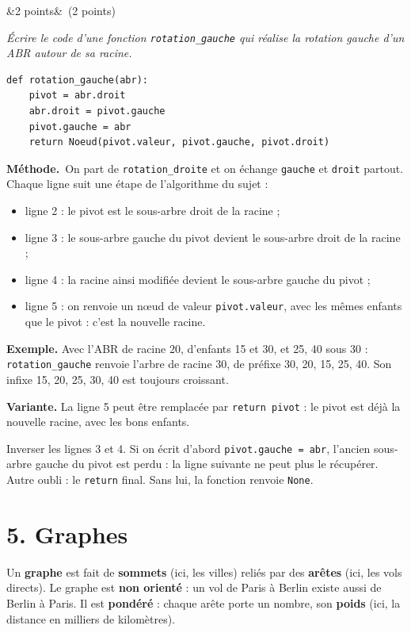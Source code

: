 \documentclass[11pt, a4paper]{exam}
\newcommand{\code}[1]{\texttt{#1}}
\newcommand{\Q}[3]{\par\needspace{5\baselineskip}\bigskip\noindent{\large\bfseries Question #1}\ifx&#2&\else\ \textnormal{(#2)}\fi\par\nopagebreak\smallskip\noindent\textit{#3}\par\nopagebreak\smallskip}
\newcommand{\methode}{\par\noindent\textbf{Méthode.}\ }
\begin{document}
\Q{6 (c)}{2 points}{Écrire le code d'une fonction \code{rotation\_gauche} qui réalise la rotation gauche d'un ABR autour de sa racine.}
\begin{reponse}
\begin{lstlisting}
def rotation_gauche(abr):
    pivot = abr.droit
    abr.droit = pivot.gauche
    pivot.gauche = abr
    return Noeud(pivot.valeur, pivot.gauche, pivot.droit)
\end{lstlisting}
\end{reponse}
\methode On part de \code{rotation\_droite} et on échange \code{gauche} et \code{droit} partout. Chaque ligne suit une étape de l'algorithme du sujet :
\begin{itemize}
\item ligne 2 : le pivot est le sous-arbre droit de la racine ;
\item ligne 3 : le sous-arbre gauche du pivot devient le sous-arbre droit de la racine ;
\item ligne 4 : la racine ainsi modifiée devient le sous-arbre gauche du pivot ;
\item ligne 5 : on renvoie un nœud de valeur \code{pivot.valeur}, avec les mêmes enfants que le pivot : c'est la nouvelle racine.
\end{itemize}
\textbf{Exemple.} Avec l'ABR de racine 20, d'enfants 15 et 30, et 25, 40 sous 30 : \code{rotation\_gauche} renvoie l'arbre de racine 30, de préfixe 30, 20, 15, 25, 40. Son infixe 15, 20, 25, 30, 40 est toujours croissant.

\textbf{Variante.} La ligne 5 peut être remplacée par \code{return pivot} : le pivot est déjà la nouvelle racine, avec les bons enfants.
\begin{erreur}
Inverser les lignes 3 et 4. Si on écrit d'abord \code{pivot.gauche = abr}, l'ancien sous-arbre gauche du pivot est perdu : la ligne suivante ne peut plus le récupérer. Autre oubli : le \code{return} final. Sans lui, la fonction renvoie \code{None}.
\end{erreur}

\section*{5. Graphes}

\begin{retenir}
Un \textbf{graphe} est fait de \textbf{sommets} (ici, les villes) reliés par des \textbf{arêtes} (ici, les vols directs). Le graphe est \textbf{non orienté} : un vol de Paris à Berlin existe aussi de Berlin à Paris. Il est \textbf{pondéré} : chaque arête porte un nombre, son \textbf{poids} (ici, la distance en milliers de kilomètres).
\end{retenir}
\end{document}
